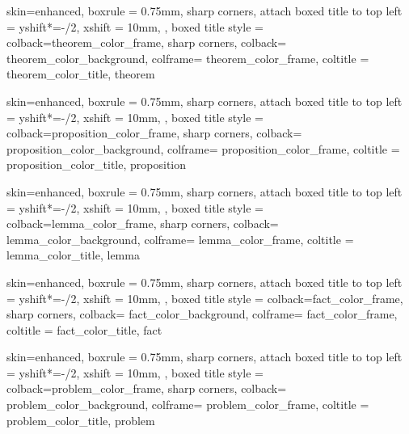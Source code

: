 
{
  skin=enhanced,
  boxrule = 0.75mm,
  sharp corners,
  attach boxed title to top left = {
      yshift*=-\tcboxedtitleheight/2,
      xshift = 10mm,
    },
  boxed title style = {colback=theorem_color_frame, sharp corners},
  colback= theorem_color_background,
  colframe= theorem_color_frame,
  coltitle = theorem_color_title,
}{theorem}

{
  skin=enhanced,
  boxrule = 0.75mm,
  sharp corners,
  attach boxed title to top left = {
      yshift*=-\tcboxedtitleheight/2,
      xshift = 10mm,
    },
  boxed title style = {colback=proposition_color_frame, sharp corners},
  colback= proposition_color_background,
  colframe= proposition_color_frame,
  coltitle = proposition_color_title,
}{proposition}

{
  skin=enhanced,
  boxrule = 0.75mm,
  sharp corners,
  attach boxed title to top left = {
      yshift*=-\tcboxedtitleheight/2,
      xshift = 10mm,
    },
  boxed title style = {colback=lemma_color_frame, sharp corners},
  colback= lemma_color_background,
  colframe= lemma_color_frame,
  coltitle = lemma_color_title,
}{lemma}


{
  skin=enhanced,
  boxrule = 0.75mm,
  sharp corners,
  attach boxed title to top left = {
      yshift*=-\tcboxedtitleheight/2,
      xshift = 10mm,
    },
  boxed title style = {colback=fact_color_frame, sharp corners},
  colback= fact_color_background,
  colframe= fact_color_frame,
  coltitle = fact_color_title,
}{fact}

{
  skin=enhanced,
  boxrule = 0.75mm,
  sharp corners,
  attach boxed title to top left = {
      yshift*=-\tcboxedtitleheight/2,
      xshift = 10mm,
    },
  boxed title style = {colback=problem_color_frame, sharp corners},
  colback= problem_color_background,
  colframe= problem_color_frame,
  coltitle = problem_color_title,
}{problem}

